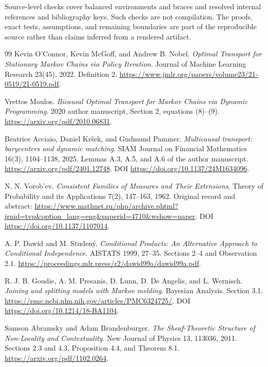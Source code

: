 \documentclass[11pt]{article}
\theoremstyle{remark}
\begin{document}
Source-level checks cover balanced environments and braces and resolved internal references and bibliography keys. Such checks are not compilation. The proofs, exact tests, assumptions, and remaining boundaries are part of the reproducible source rather than claims inferred from a rendered artifact.

\begin{thebibliography}{99}
Kevin O'Connor, Kevin McGoff, and Andrew B. Nobel.
\emph{Optimal Transport for Stationary Markov Chains via Policy Iteration}.
Journal of Machine Learning Research 23(45), 2022. Definition 2.
\url{https://www.jmlr.org/papers/volume23/21-0519/21-0519.pdf}.

Vrettos Moulos.
\emph{Bicausal Optimal Transport for Markov Chains via Dynamic Programming}.
2020 author manuscript, Section 2, equations (8)--(9).
\url{https://arxiv.org/pdf/2010.06831}.

Beatrice Acciaio, Daniel Kr\v sek, and Gudmund Pammer.
\emph{Multicausal transport: barycenters and dynamic matching}.
SIAM Journal on Financial Mathematics 16(3), 1104--1138, 2025.
Lemmas A.3, A.5, and A.6 of the author manuscript.
\url{https://arxiv.org/pdf/2401.12748}.
DOI \url{https://doi.org/10.1137/24M1634096}.

N. N. Vorob'ev.
\emph{Consistent Families of Measures and Their Extensions}.
Theory of Probability and its Applications 7(2), 147--163, 1962.
Original record and abstract:
\url{https://www.mathnet.ru/php/archive.phtml?jrnid=tvp&option_lang=eng&paperid=4710&wshow=paper}.
DOI \url{https://doi.org/10.1137/1107014}.

A. P. Dawid and M. Studen\'y.
\emph{Conditional Products: An Alternative Approach to Conditional Independence}.
AISTATS 1999, 27--35. Sections 2--4 and Observation 2.1.
\url{https://proceedings.mlr.press/r2/dawid99a/dawid99a.pdf}.

R. J. B. Goudie, A. M. Presanis, D. Lunn, D. De Angelis, and L. Wernisch.
\emph{Joining and splitting models with Markov melding}.
Bayesian Analysis. Section 3.1.
\url{https://pmc.ncbi.nlm.nih.gov/articles/PMC6324725/}.
DOI \url{https://doi.org/10.1214/18-BA1104}.

Samson Abramsky and Adam Brandenburger.
\emph{The Sheaf-Theoretic Structure of Non-Locality and Contextuality}.
New Journal of Physics 13, 113036, 2011.
Sections 2.3 and 4.3, Proposition 4.4, and Theorem 8.1.
\url{https://arxiv.org/pdf/1102.0264}.


\end{thebibliography}
\end{document}
